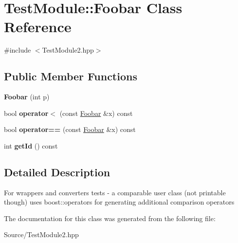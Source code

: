\hypertarget{class_test_module_1_1_foobar}{
\section{TestModule::Foobar Class Reference}
\label{class_test_module_1_1_foobar}
}


{\ttfamily \#include $<$TestModule2.hpp$>$}

\subsection*{Public Member Functions}
\begin{DoxyCompactItemize}
\item 
\hypertarget{class_test_module_1_1_foobar_a1aa84b54569ba0a6e7f5a6b01b4537b2}{
{\bfseries Foobar} (int p)}
\label{class_test_module_1_1_foobar_a1aa84b54569ba0a6e7f5a6b01b4537b2}

\item 
\hypertarget{class_test_module_1_1_foobar_a415da79b30d3c7153031efaaf1ea51a4}{
bool {\bfseries operator$<$} (const \hyperlink{class_test_module_1_1_foobar}{Foobar} \&x) const }
\label{class_test_module_1_1_foobar_a415da79b30d3c7153031efaaf1ea51a4}

\item 
\hypertarget{class_test_module_1_1_foobar_ae97c5b30034144a46307c9eab0110eee}{
bool {\bfseries operator==} (const \hyperlink{class_test_module_1_1_foobar}{Foobar} \&x) const }
\label{class_test_module_1_1_foobar_ae97c5b30034144a46307c9eab0110eee}

\item 
\hypertarget{class_test_module_1_1_foobar_aee9173287969eae79f0ba35ed6a0876c}{
int {\bfseries getId} () const }
\label{class_test_module_1_1_foobar_aee9173287969eae79f0ba35ed6a0876c}

\end{DoxyCompactItemize}


\subsection{Detailed Description}
For wrappers and converters tests -\/ a comparable user class (not printable though) uses boost::operators for generating additional comparison operators 

The documentation for this class was generated from the following file:\begin{DoxyCompactItemize}
\item 
Source/TestModule2.hpp\end{DoxyCompactItemize}
